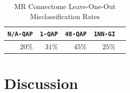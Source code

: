 \documentclass[10pt,journal,cspaper,compsoc]{IEEEtran}
\begin{document}
% 
% 

\begin{table}[h!]
\caption{MR Connectome Leave-One-Out Misclassification Rates}
\begin{center}
\begin{tabular}{|r|r|r|r|r|}
\hline
\texttt{N/A-QAP} & \texttt{1-QAP} & \texttt{48-QAP} & \texttt{1NN-GI}\\
\hline
$20\%$ & $31\%$ & $45\%$  & $25\%$ \\
    \hline
\end{tabular}
\end{center}
\label{tab:connectome}
\end{table}%


\section{Discussion}
\end{document}
